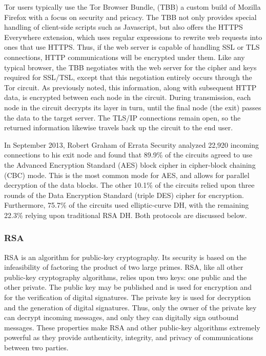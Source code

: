\documentclass[journal]{IEEEtran}
\begin{document}
Tor users typically use the Tor Browser Bundle, (TBB) a custom build of Mozilla Firefox with a focus on security and pricacy. The TBB not only provides special handling of client-side scripts such as Javascript, but also offers the HTTPS Everywhere extension, which uses regular expressions to rewrite web requests into ones that use HTTPS. Thus, if the web server is capable of handling SSL or TLS connections, HTTP communications will be encrypted under them. Like any typical browser, the TBB negotiates with the web server for the cipher and keys required for SSL/TSL, except that this negotiation entirely occurs through the Tor circuit. As previously noted, this information, along with subsequent HTTP data, is encrypted between each node in the circuit. During transmission, each node in the circuit decrypts its layer in turn, until the final node (the exit) passes the data to the target server. The TLS/IP connections remain open, so the returned information likewise travels back up the circuit to the end user.

In September 2013, Robert Graham of Errata Security analyzed 22,920 incoming connections to his exit node and found that 89.9\% of the circuits agreed to use the Advanced Encryption Standard (AES) block cipher in cipher-block chaining (CBC) mode. This is the most common mode for AES, and allows for parallel decryption of the data blocks. The other 10.1\% of the circuits relied upon three rounds of the Data Encryption Standard (triple DES) cipher for encryption. Furthermore, 75.7\% of the circuits used elliptic-curve DH, with the remaining 22.3\% relying upon traditional RSA DH.\cite{Graham2013} Both protocols are discussed below.

\subsubsection{RSA}

RSA is an algorithm for public-key cryptography. Its security is based on the infeasibility of factoring the product of two large primes. RSA, like all other public-key cryptography algorithms, relies upon two keys: one public and the other private. The public key may be published and is used for encryption and for the verification of digital signatures. The private key is used for decryption and the generation of digital signatures. Thus, only the owner of the private key can decrypt incoming messages, and only they can digitally sign outbound messages. These properties make RSA and other public-key algorithms extremely powerful as they provide authenticity, integrity, and privacy of communications between two parties.
\end{document}
